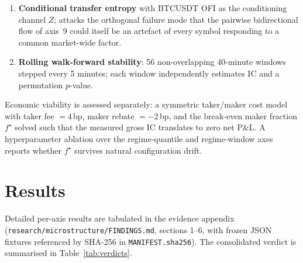 \documentclass[11pt,a4paper]{article}
\begin{document}
\begin{enumerate}
  \item \textbf{Conditional transfer entropy} with BTCUSDT OFI as the
  conditioning channel $Z$; attacks the orthogonal failure mode that
  the pairwise bidirectional flow of axis~9 could itself be an artefact
  of every symbol responding to a common market-wide factor.

  \item \textbf{Rolling walk-forward stability}: 56 non-overlapping
  40-minute windows stepped every 5 minutes; each window independently
  estimates IC and a permutation $p$-value.
\end{enumerate}

Economic viability is assessed separately: a symmetric taker/maker cost
model with taker fee $=4$\,bp, maker rebate $=-2$\,bp, and the break-even
maker fraction $f^{\star}$ solved such that the measured gross IC
translates to zero net P\&L. A hyperparameter ablation over the
regime-quantile and regime-window axes reports whether $f^{\star}$
survives natural configuration drift.

\section{Results}
\label{sec:results}

Detailed per-axis results are tabulated in the evidence appendix
(\texttt{research/microstructure/FINDINGS.md}, sections 1--6, with frozen
JSON fixtures referenced by SHA-256 in \texttt{MANIFEST.sha256}). The
consolidated verdict is summarised in Table~\ref{tab:verdicts}.
\end{document}
